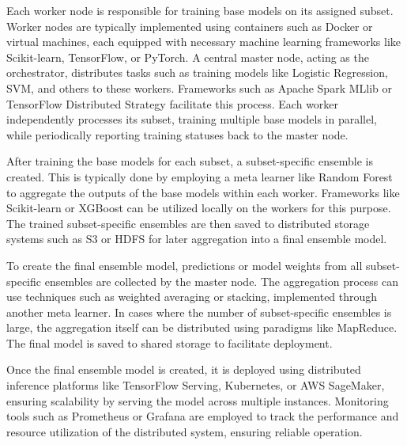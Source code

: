 \vspace{1em}

\noindent
Each worker node is responsible for training base models on its assigned subset. Worker nodes are typically implemented using containers such as Docker or virtual machines, each equipped with necessary machine learning frameworks like Scikit-learn, TensorFlow, or PyTorch. A central master node, acting as the orchestrator, distributes tasks such as training models like Logistic Regression, SVM, and others to these workers. Frameworks such as Apache Spark MLlib or TensorFlow Distributed Strategy facilitate this process. Each worker independently processes its subset, training multiple base models in parallel, while periodically reporting training statuses back to the master node.

\vspace{1em}

\noindent
After training the base models for each subset, a subset-specific ensemble is created. This is typically done by employing a meta learner like Random Forest to aggregate the outputs of the base models within each worker. Frameworks like Scikit-learn or XGBoost can be utilized locally on the workers for this purpose. The trained subset-specific ensembles are then saved to distributed storage systems such as S3 or HDFS for later aggregation into a final ensemble model.

\vspace{1em}

\noindent
To create the final ensemble model, predictions or model weights from all subset-specific ensembles are collected by the master node. The aggregation process can use techniques such as weighted averaging or stacking, implemented through another meta learner. In cases where the number of subset-specific ensembles is large, the aggregation itself can be distributed using paradigms like MapReduce. The final model is saved to shared storage to facilitate deployment.

\vspace{1em}

\noindent
Once the final ensemble model is created, it is deployed using distributed inference platforms like TensorFlow Serving, Kubernetes, or AWS SageMaker, ensuring scalability by serving the model across multiple instances. Monitoring tools such as Prometheus or Grafana are employed to track the performance and resource utilization of the distributed system, ensuring reliable operation.

\vspace{1em}

